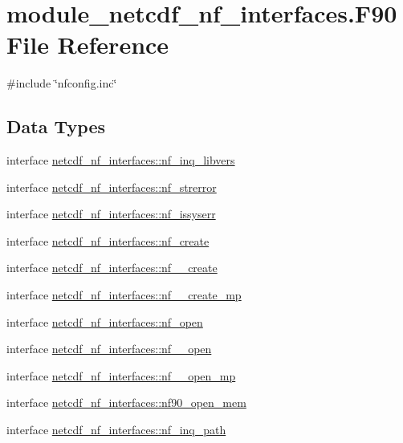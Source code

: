 \hypertarget{module__netcdf__nf__interfaces_8F90}{}\section{module\+\_\+netcdf\+\_\+nf\+\_\+interfaces.\+F90 File Reference}
\label{module__netcdf__nf__interfaces_8F90}
{\ttfamily \#include \char`\"{}nfconfig.\+inc\char`\"{}}\newline
\subsection*{Data Types}
\begin{DoxyCompactItemize}
\item 
interface \hyperlink{interfacenetcdf__nf__interfaces_1_1nf__inq__libvers}{netcdf\+\_\+nf\+\_\+interfaces\+::nf\+\_\+inq\+\_\+libvers}
\item 
interface \hyperlink{interfacenetcdf__nf__interfaces_1_1nf__strerror}{netcdf\+\_\+nf\+\_\+interfaces\+::nf\+\_\+strerror}
\item 
interface \hyperlink{interfacenetcdf__nf__interfaces_1_1nf__issyserr}{netcdf\+\_\+nf\+\_\+interfaces\+::nf\+\_\+issyserr}
\item 
interface \hyperlink{interfacenetcdf__nf__interfaces_1_1nf__create}{netcdf\+\_\+nf\+\_\+interfaces\+::nf\+\_\+create}
\item 
interface \hyperlink{interfacenetcdf__nf__interfaces_1_1nf____create}{netcdf\+\_\+nf\+\_\+interfaces\+::nf\+\_\+\+\_\+create}
\item 
interface \hyperlink{interfacenetcdf__nf__interfaces_1_1nf____create__mp}{netcdf\+\_\+nf\+\_\+interfaces\+::nf\+\_\+\+\_\+create\+\_\+mp}
\item 
interface \hyperlink{interfacenetcdf__nf__interfaces_1_1nf__open}{netcdf\+\_\+nf\+\_\+interfaces\+::nf\+\_\+open}
\item 
interface \hyperlink{interfacenetcdf__nf__interfaces_1_1nf____open}{netcdf\+\_\+nf\+\_\+interfaces\+::nf\+\_\+\+\_\+open}
\item 
interface \hyperlink{interfacenetcdf__nf__interfaces_1_1nf____open__mp}{netcdf\+\_\+nf\+\_\+interfaces\+::nf\+\_\+\+\_\+open\+\_\+mp}
\item 
interface \hyperlink{interfacenetcdf__nf__interfaces_1_1nf90__open__mem}{netcdf\+\_\+nf\+\_\+interfaces\+::nf90\+\_\+open\+\_\+mem}
\item 
interface \hyperlink{interfacenetcdf__nf__interfaces_1_1nf__inq__path}{netcdf\+\_\+nf\+\_\+interfaces\+::nf\+\_\+inq\+\_\+path}

\end{DoxyCompactItemize}
